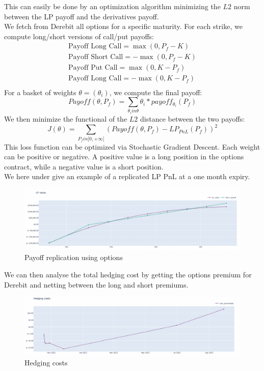 \documentclass[conference]{IEEEtran}
\begin{document}
This can easily be done by an optimization algorithm minimizing the $L2$ norm between the LP payoff and the derivatives payoff.\\
We fetch from Derebit all options for a specific maturity. For each strike, we compute long/short versions of call/put payoffs:\\
\begin{equation}
\begin{array}{llll}
\text{Payoff Long Call} =  \max(0,P_f-K)\\
\text{Payoff Short Call} = -\max(0,P_f-K)\\
\text{Payoff Put Call} = \max(0,K-P_f)\\
\text{Payoff Long Call} = -\max(0,K-P_f)\\
\end{array}
\end{equation}
For a basket of weights $\theta=(\theta_i)$, we compute the final payoff:\\
\begin{equation}
Payoff(\theta, P_f) =\sum_{\theta_i in\theta}\theta_i*payoff_{\theta_i}(P_f)
\end{equation}
We then minimize the functional of the $L2$ distance between the two payoffs:
\begin{equation}
J(\theta) = \sum_{P_f in [0,+\infty[}(Payoff(\theta, P_f)-LP_{PnL}(P_f))^2
\end{equation}
This loss function can be optimized via Stochastic Gradient Descent. 
Each weight can be positive or negative. A positive value is a
long position in the options contract, while a negative value is a
short position.\\
We here under give an example of a replicated LP PnL at a one month expiry.
\begin{figure}[h!]
    \centering
    \includegraphics[scale=0.2]{Plots/option_hedging.png}
    \caption{Payoff replication using options}
    \label{fig:conc_liquidity}
\end{figure}
We can then analyse the total hedging cost by getting the options premium for Derebit and netting between the long and short premiums.
\begin{figure}[h!]
    \centering
    \includegraphics[scale=0.2]{Plots/hedging_costs.png}
    \caption{Hedging costs}
    \label{fig:conc_liquidity}
\end{figure}
\end{document}
